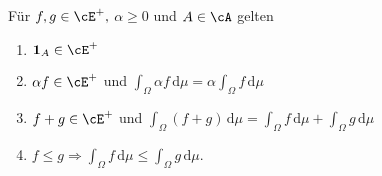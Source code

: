 \begin{lemma}
	Für $f,g \in \cE^+,$ $ \alpha \geq 0$ und $A\in \cA$ gelten
	\begin{enumerate}[label=(\roman*)]
		\item $\mathbf{1}_A \in \cE^+$
		\item $\alpha f \in \cE^+$ und $\int_{\Omega} \alpha f \, \mathrm{d}\mu = \alpha \int_{\Omega} f\,  \mathrm{d}\mu$ 
		\item $ f + g \in \cE^+$ und $\int_{\Omega}(f + g) \,\mathrm{d}\mu = \int_{\Omega} f\, \mathrm{d}\mu + \int_{\Omega} g \,\mathrm{d}\mu$
		\item $ f \leq g \Rightarrow \int_{\Omega} f \,\mathrm{d}\mu \leq \int_{\Omega} g\, \mathrm{d}\mu$.
 	\end{enumerate}
\end{lemma}

